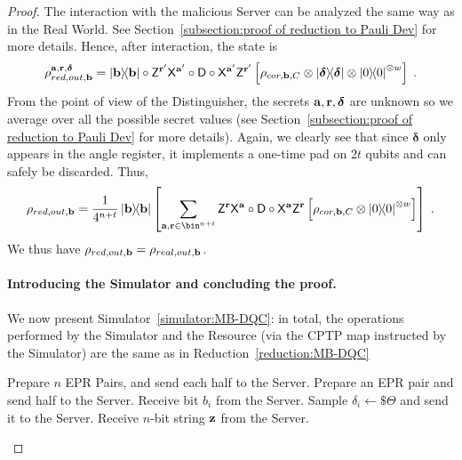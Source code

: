 \begin{proof}
    The interaction with the malicious Server can be analyzed the same way as in the Real World. See Section~\ref{subsection:proof of reduction to Pauli Dev} for more details. Hence, after interaction, the state is
    \begin{equation}
            \rho_{red, out, \b}^{\a, \r, \boldsymbol{\delta}}
            =
            \ketbra\b
            \circ
            \Dec{\a'}{\r'}
            \circ
            \D
            \circ
            \Enc{\a'}{\r'}
            \left[
                \rho_{cor, \b, C}
                \otimes
            \ketbra{\boldsymbol\delta}
            \otimes
            \ketbra{0}^{\otimes w}
            \right]\; .
        \end{equation}
        From the point of view of the Distinguisher, the secrets $\mathbf a, \mathbf r, \boldsymbol{\delta}$ are unknown so we average over all the possible secret values (see Section~\ref{subsection:proof of reduction to Pauli Dev} for more details). Again, we clearly see that since $\boldsymbol{\delta}$ only appears in the angle register, it implements a one-time pad on $2t$ qubits and can safely be discarded. Thus,
            \begin{equation}
        \rho_{red, out, \b}
        =
        \dfrac{1}{4^{n+t}}
            \ketbra\b
            \left[
                \sum_{\a, \r\in \bin^{n+t}}
                \Dec{\a}{\r}
                \circ
                \D
                \circ
                \Enc{\a}{\r}
                \left[
                    \rho_{cor, \b, C}
                \otimes
                \ketbra{0}^{\otimes w}
                \right]
            \right]
            \; .
    \end{equation}
    We thus have $\rho_{red, out, \mathbf b} = \rho_{real, out, \mathbf b}$.

    \paragraph{Introducing the Simulator and concluding the proof.}
    We now present Simulator~\ref{simulator:MB-DQC}: in total, the operations performed by the Simulator and the Resource (via the CPTP map instructed by the Simulator) are the same as in Reduction~\ref{reduction:MB-DQC}

    \begin{simulatorr}
    \caption{MB-DQC}
    \label{simulator:MB-DQC}
    \begin{algorithmic}[1]
        \State Prepare $n$ EPR Pairs, and send each half to the Server.
        \State Prepare an EPR pair and send half to the Server.
        \State Receive bit $b_i$ from the Server.
        \State Sample $\delta_i \gets \$\Theta$ and send it to the Server.
        \EndFor
        \State Receive $n$-bit string $\mathbf z$ from the Server.
        \EndProcedure


\end{algorithmic}
\end{simulatorr}
\end{proof}
